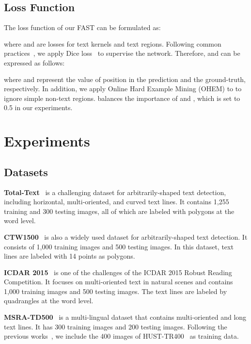 \documentclass[lettersize,journal]{IEEEtran}
\begin{document}
\subsection{Loss Function}

The loss function of our FAST can be formulated as:

where  and  are losses for text kernels and text regions.
Following common practices~\cite{wang2019shape,wang2019efficient},
we apply Dice loss~\cite{milletari2016fully} to supervise the network. Therefore,  and  can be expressed as follows:



where  and  represent the value of position  in the prediction and the ground-truth, respectively. 
In addition, we apply Online Hard Example Mining (OHEM) \cite{shrivastava2016training} to  to ignore simple non-text regions.
 balances the importance of  and , which is set to 0.5 in our experiments.



\section{Experiments}

\subsection{Datasets}

\noindent \textbf{Total-Text}~\cite{ch2017total} is a challenging dataset for arbitrarily-shaped text detection, including horizontal, multi-oriented, and curved text lines. 
It contains 1,255 training and 300 testing images, all of which are labeled with polygons at the word level.

\noindent \textbf{CTW1500}~\cite{liu2019curved} is also a widely used dataset for arbitrarily-shaped text detection.
It consists of 1,000 training images and 500 testing images. 
In this dataset, text lines are labeled with 14 points as polygons.

\noindent \textbf{ICDAR 2015}~\cite{karatzas2015icdar} is one of the challenges of the ICDAR 2015 Robust Reading Competition. 
It focuses on multi-oriented text in natural scenes and contains 1,000 training images and 500 testing images. 
The text lines are labeled by quadrangles at the word level.

\noindent \textbf{MSRA-TD500}~\cite{yao2012detecting} is a multi-lingual dataset that contains multi-oriented and long text lines. It has 300 training images and 200 testing images. 
Following the previous works~\cite{long2018textsnake,lyu2018multi,zhou2017east}, we include the 400 images of HUST-TR400~\cite{yao2014unified} as training data.
\end{document}
